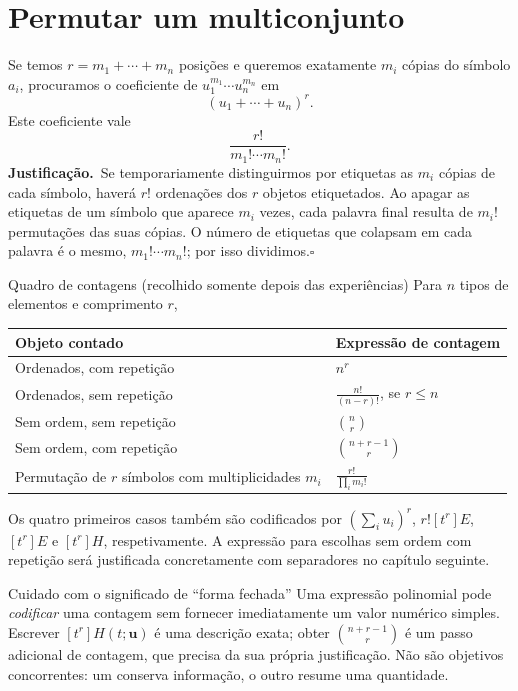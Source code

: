 \documentclass[11pt,a4paper,oneside]{book}
\newcommand{\prova}{\textbf{Justificação.}\ }
\newcommand{\fimprova}{\hfill$\square$}
\begin{document}
\section{Permutar um multiconjunto}
Se temos $r=m_1+\cdots+m_n$ posições e queremos exatamente $m_i$ cópias do símbolo $a_i$, procuramos o coeficiente de $u_1^{m_1}\cdots u_n^{m_n}$ em
\[(u_1+\cdots+u_n)^r.\]
Este coeficiente vale
\[\frac{r!}{m_1!\cdots m_n!}.\]
\prova Se temporariamente distinguirmos por etiquetas as $m_i$ cópias de cada símbolo, haverá $r!$ ordenações dos $r$ objetos etiquetados. Ao apagar as etiquetas de um símbolo que aparece $m_i$ vezes, cada palavra final resulta de $m_i!$ permutações das suas cópias. O número de etiquetas que colapsam em cada palavra é o mesmo, $m_1!\cdots m_n!$; por isso dividimos.\fimprova
\begin{teoremabox}{Quadro de contagens (recolhido somente depois das experiências)}
Para $n$ tipos de elementos e comprimento $r$,
\begin{center}\small
\begin{tabularx}{\linewidth}{>{\raggedright\arraybackslash}p{3.9cm} >{\raggedright\arraybackslash}X}
\toprule
Objeto contado & Expressão de contagem\\\midrule
Ordenados, com repetição & $n^r$\\
Ordenados, sem repetição & $\displaystyle\frac{n!}{(n-r)!}$, se $r\le n$\\
Sem ordem, sem repetição & $\displaystyle\binom nr$\\
Sem ordem, com repetição & $\displaystyle\binom{n+r-1}{r}$\\
Permutação de $r$ símbolos com multiplicidades $m_i$ & $\displaystyle\frac{r!}{\prod_i m_i!}$\\
\bottomrule
\end{tabularx}
\end{center}
Os quatro primeiros casos também são codificados por $(\sum_i u_i)^r$, $r![t^r]E$, $[t^r]E$ e $[t^r]H$, respetivamente. A expressão para escolhas sem ordem com repetição será justificada concretamente com separadores no capítulo seguinte.
\end{teoremabox}
\begin{observacaobox}{Cuidado com o significado de ``forma fechada''}
Uma expressão polinomial pode \emph{codificar} uma contagem sem fornecer imediatamente um valor numérico simples. Escrever $[t^r]H(t;\mathbf u)$ é uma descrição exata; obter $\binom{n+r-1}{r}$ é um passo adicional de contagem, que precisa da sua própria justificação. Não são objetivos concorrentes: um conserva informação, o outro resume uma quantidade.
\end{observacaobox}
\end{document}
